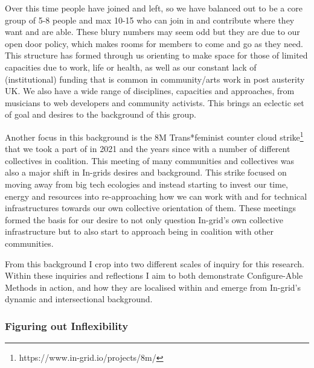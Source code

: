 Over this time people have joined and left, so we have balanced out to
be a core group of 5-8 people and max 10-15 who can join in and
contribute where they want and are able. These blury numbers may seem
odd but they are due to our open door policy, which makes rooms for
members to come and go as they need. This structure has formed through
us orienting to make space for those of limited capacities due to work,
life or health, as well as our constant lack of (institutional) funding
that is common in community/arts work in post austerity UK. We also have
a wide range of disciplines, capacities and approaches, from musicians
to web developers and community activists. This brings an eclectic set
of goal and desires to the background of this group.

Another focus in this background is the 8M Trans*feminist counter cloud
strike\footnote{https://www.in-grid.io/projects/8m/} that we took a part
of in 2021 and the years since with a number of different collectives in
coalition. This meeting of many communities and collectives was also a
major shift in In-grids desires and background. This strike focused on
moving away from big tech ecologies and instead starting to invest our
time, energy and resources into re-approaching how we can work with and
for technical infrastructures towards our own collective orientation of
them. These meetings formed the basis for our desire to not only
question In-grid's own collective infrastructure but to also start to
approach being in coalition with other communities.

From this background I crop into two different scales of inquiry for
this research. Within these inquiries and reflections I aim to both
demonstrate Configure-Able Methods in action, and how they are localised
within and emerge from In-grid's dynamic and intersectional background.

\hypertarget{figuring-out-inflexibility}{%
\subsubsection{Figuring out
Inflexibility}\label{figuring-out-inflexibility}}

